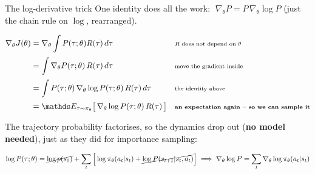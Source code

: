 \documentclass[aspectratio=169]{beamer}
\begin{document}
\begin{frame}{The log-derivative trick}
  \small
  One identity does all the work: $\;\nabla_\theta P = P \,\nabla_\theta \log P$
  (just the chain rule on $\log$, rearranged).

  \vskip 3pt
  \begin{tcolorbox}[colback=lightbg, colframe=popblue, boxrule=0.7pt, arc=2pt]
    \footnotesize
    \begin{align*}
      \nabla_\theta J(\theta) &= \nabla_\theta \int P(\tau;\theta) R(\tau)\, d\tau
        && \text{\scriptsize $R$ does not depend on $\theta$} \\[2pt]
      &= \int \nabla_\theta P(\tau;\theta)\, R(\tau)\, d\tau
        && \text{\scriptsize move the gradient inside} \\[2pt]
      &= \int P(\tau;\theta)\, \nabla_\theta \log P(\tau;\theta)\, R(\tau)\, d\tau
        && \text{\scriptsize the identity above} \\[2pt]
      &= \E_{\tau \sim \pi_\theta}\big[\, \nabla_\theta \log P(\tau;\theta)\, R(\tau) \,\big]
        && \text{\scriptsize \textbf{an expectation again -- so we can sample it}}
    \end{align*}
  \end{tcolorbox}

  \vskip 2pt
  The trajectory probability factorises, so the dynamics drop out (\textbf{no model needed}),
  just as they did for importance sampling:

  \vskip 1pt
  \begin{tcolorbox}[colback=paramgreen!8, colframe=paramgreen, boxrule=0.7pt, arc=2pt]
    \scriptsize
    \vskip -6pt
    \[ \log P(\tau;\theta) = \cancel{\log p(s_0)} + \sum_t \Big[ \log \pi_\theta(a_t|s_t) + \cancel{\log P(s_{t+1}|s_t,a_t)} \Big]
       \;\Longrightarrow\; \nabla_\theta \log P = \sum_t \nabla_\theta \log \pi_\theta(a_t|s_t) \]
    \vskip -10pt
  \end{tcolorbox}
\end{frame}
\end{document}
